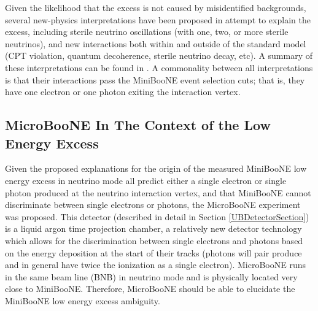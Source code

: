 Given the likelihood that the excess is not caused by misidentified backgrounds, several new-physics interpretations have been proposed in attempt to explain the excess, including sterile neutrino oscillations (with one, two, or more sterile neutrinos), and new interactions both within and outside of the standard model (CPT violation, quantum decoherence, sterile neutrino decay, etc). A summary of these interpretations can be found in \cite{MBLEESourcesOverview}. A commonality between all interpretations is that their interactions pass the MiniBooNE event selection cuts; that is, they have one electron or one photon exiting the interaction vertex.

\subsection{MicroBooNE In The Context of the Low Energy Excess}\label{georgia_scaling_description}

Given the proposed explanations for the origin of the measured MiniBooNE low energy excess in neutrino mode all predict either a single electron or single photon produced at the neutrino interaction vertex, and that MiniBooNE cannot discriminate between single electrons or photons, the MicroBooNE experiment was proposed. This detector (described in detail in Section \ref{UBDetectorSection}) is a liquid argon time projection chamber, a relatively new detector technology which allows for the discrimination between single electrons and photons based on the energy deposition at the start of their tracks (photons will pair produce and in general have twice the ionization as a single electron). MicroBooNE runs in the same beam line (BNB) in neutrino mode and is physically located very close to MiniBooNE. Therefore, MicroBooNE should be able to elucidate the MiniBooNE low energy excess ambiguity. \\


